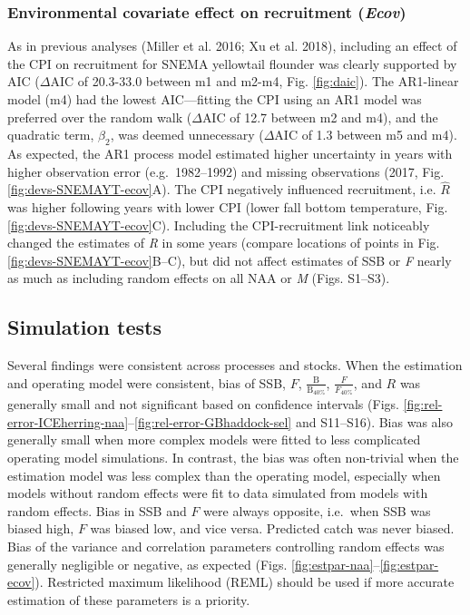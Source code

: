 \documentclass[]{article}
\begin{document}
\hypertarget{environmental-covariate-effect-on-recruitment-ecov}{%
\subsubsection{\texorpdfstring{Environmental covariate effect on
recruitment
(\emph{Ecov})}{Environmental covariate effect on recruitment (Ecov)}}\label{environmental-covariate-effect-on-recruitment-ecov}}

As in previous analyses (Miller et al. 2016; Xu et al. 2018), including
an effect of the CPI on recruitment for SNEMA yellowtail flounder was
clearly supported by AIC (\(\Delta \text{AIC}\) of 20.3-33.0 between m1
and m2-m4, Fig. \ref{fig:daic}). The AR1-linear model (m4) had the
lowest AIC---fitting the CPI using an AR1 model was preferred over the
random walk (\(\Delta \text{AIC}\) of 12.7 between m2 and m4), and the
quadratic term, \(\beta_2\), was deemed unnecessary
(\(\Delta \text{AIC}\) of 1.3 between m5 and m4). As expected, the AR1
process model estimated higher uncertainty in years with higher
observation error (e.g.~1982--1992) and missing observations (2017, Fig.
\ref{fig:devs-SNEMAYT-ecov}A). The CPI negatively influenced
recruitment, i.e. \(\hat{R}\) was higher following years with lower CPI
(lower fall bottom temperature, Fig. \ref{fig:devs-SNEMAYT-ecov}C).
Including the CPI-recruitment link noticeably changed the estimates of
\emph{R} in some years (compare locations of points in Fig.
\ref{fig:devs-SNEMAYT-ecov}B--C), but did not affect estimates of SSB or
\emph{F} nearly as much as including random effects on all NAA or
\emph{M} (Figs. S1--S3).

\hypertarget{simulation-tests-1}{%
\subsection{Simulation tests}\label{simulation-tests-1}}

Several findings were consistent across processes and stocks. When the
estimation and operating model were consistent, bias of SSB, \(F\),
\(\frac{\text{B}}{\text{B}_{40\%}}\), \(\frac{F}{F_{40\%}}\), and \(R\)
was generally small and not significant based on confidence intervals
(Figs.
\ref{fig:rel-error-ICEherring-naa}--\ref{fig:rel-error-GBhaddock-sel}
and S11--S16). Bias was also generally small when more complex models
were fitted to less complicated operating model simulations. In
contrast, the bias was often non-trivial when the estimation model was
less complex than the operating model, especially when models without
random effects were fit to data simulated from models with random
effects. Bias in SSB and \(F\) were always opposite, i.e.~when SSB was
biased high, \(F\) was biased low, and vice versa. Predicted catch was
never biased. Bias of the variance and correlation parameters
controlling random effects was generally negligible or negative, as
expected (Figs. \ref{fig:estpar-naa}--\ref{fig:estpar-ecov}). Restricted
maximum likelihood (REML) should be used if more accurate estimation of
these parameters is a priority.
\end{document}
